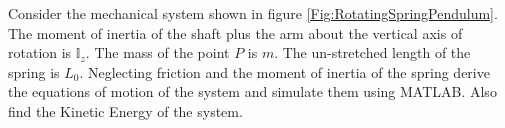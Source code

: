 \documentclass[graybox,envcountchap,sectrefs]{svmonoMuga}
\begin{document}
\begin{exercise}\label{ex:RotatingPend}
Consider the mechanical system shown in figure \ref{Fig:RotatingSpringPendulum}. The moment of inertia of the shaft plus the arm about the vertical axis of rotation is $\mathbb{I}_z$. The mass 
of the point $P$ is $m$. The un-stretched length of the spring is $L_0$. Neglecting friction and the moment of inertia of the spring derive the equations of motion of the system and 
simulate them using MATLAB. Also find the Kinetic Energy of the system.
\end{exercise}



\end{document}
